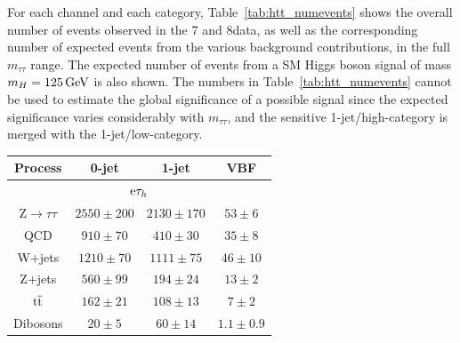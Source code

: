 \documentclass[11pt,twoside,a4paper,cmspaper,final,collab]{cms-tdr}
\begin{document}
For each channel and each category, Table~\ref{tab:htt_numevents} shows the overall number of events observed  in the 7 and 8\TeV data,
as well as the corresponding number of expected events from the various background contributions, in the full $m_{\tau\tau}$ range.
The expected number of events from a SM Higgs boson signal of mass $m_H=125\,\text{Ge\hspace{-.08em}V}$ is also shown.
The numbers in Table~\ref{tab:htt_numevents} cannot be used to estimate the global significance of a possible signal since
the expected significance varies considerably with $m_{\tau\tau}$, and the sensitive 1-jet/high-\PT category is merged with the 1-jet/low-\PT category.


\begin{table}[!hp]
\begin{center}
\begin{tabular}{c|c|c|c}
  \hline
  Process & 0-jet & 1-jet & VBF \\
  \hline
  \hline
  \multicolumn{4}{c}{$\mathrm{e}\tau_h$} \\
  \hline
  Z$\to\tau\tau$ & $2550 \pm 200$ & $2130 \pm 170$ & $53 \pm 6$ \\
QCD & $910 \pm 70$ & $410 \pm 30$ & $35 \pm 8$ \\
W+jets & $1210 \pm 70$ & $1111 \pm 75$ & $46 \pm 10$ \\
Z+jets & $560 \pm 99$ & $194 \pm 24$ & $13 \pm 2$ \\
$\mathrm{t}\overline{\mathrm{t}}$ & $162 \pm 21$ & $108 \pm 13$ & $7 \pm 2$ \\
Dibosons & $20 \pm 5$ & $60 \pm 14$ & $1.1 \pm 0.9$ \\


\end{tabular}
\end{center}
\end{table}
\end{document}
